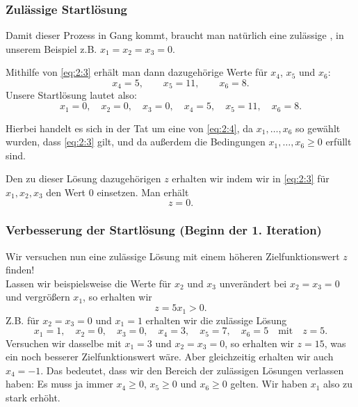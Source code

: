 \documentclass[smaller]{beamer}
\begin{document}
\begin{frame}
 \frametitle{Zul\"assige Startl\"osung}
 Damit dieser Prozess in Gang kommt, braucht man natürlich eine zulässige , in unserem Beispiel z.B. $x_1=x_2=x_3=0$.

Mithilfe von \eqref{eq:2:3} erhält man dann dazugehörige Werte für $x_4$, $x_5$ und $x_6$:
\[
x_4 = 5, \qquad x_5 = 11, \qquad x_6 = 8.
\]
Unsere Startlösung lautet also:
\begin{equation}
\label{eq:2:5}
x_1=0, \quad x_2=0, \quad x_3=0, \quad x_4 = 5, \quad x_5 = 11, \quad x_6 = 8.
\end{equation}

Hierbei handelt es sich in der Tat um eine  von \eqref{eq:2:4}, da $x_1, \ldots, x_6$ so gewählt wurden, dass \eqref{eq:2:3} gilt, und da außerdem die Bedingungen $x_1,\ldots, x_6 \geq 0$ erfüllt sind.

Den zu dieser Lösung dazugehörigen  $z$ erhalten wir indem wir in \eqref{eq:2:3} für $x_1,x_2,x_3$ den Wert $0$ einsetzen. Man erhält
\[
z=0.
\]
\end{frame}

\begin{frame}
 \frametitle{Verbesserung der Startlösung (Beginn der 1. Iteration)}
 \alert{Wir versuchen nun eine zulässige Lösung mit einem höheren Zielfunktionswert $z$ finden!} \\
 \vspace*{0.2cm}
 Lassen wir beispielsweise die Werte für $x_2$ und $x_3$ unverändert bei $x_2=x_3=0$ und vergrößern $x_1$, so erhalten wir
 \[
 z = 5x_1 > 0.
 \]
 Z.B. für $x_2=x_3=0$ und $x_1=1$ erhalten wir die zulässige Lösung
 \[
 x_1=1, \quad x_2=0, \quad x_3=0, \quad x_4=3, \quad x_5=7, \quad x_6=5 \quad \text{mit} \quad z=5.
 \]
 Versuchen wir dasselbe mit $x_1=3$ und $x_2=x_3=0$, so erhalten wir $z=15$, was ein noch besserer Zielfunktionswert wäre. Aber gleichzeitig erhalten wir auch $x_4 = -1$. \alert{Das bedeutet, dass wir den Bereich der zulässigen Lösungen verlassen haben}: Es muss ja immer $x_4 \geq 0$, $x_5 \geq 0$ und $x_6 \geq 0$ gelten. Wir haben $x_1$ also zu stark erhöht.
\end{frame}
\end{document}
